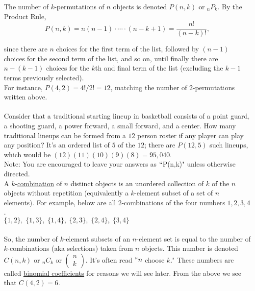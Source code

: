 \documentclass[12pt]{amsart}
\theoremstyle{definition}
\theoremstyle{remark}
\begin{document}
The number of $k$-permutations of $n$ objects is denoted $P(n,k)$ or ${}_n P_k$.  By the Product Rule, $$P(n,k)=n(n-1)\cdot \cdots \cdot(n-k+1)=\frac{n!}{(n-k)!},$$

since there are $n$ choices for the first term of the list, followed by $(n-1)$ choices for the second term of the list, and so on, until finally there are $n-(k-1)$ choices for the $k$th and final term of the list (excluding the $k-1$ terms previously selected).\\

For instance, $P(4,2)=4!/2!=12$, matching the number of $2$-permutations written above.\\ \\

Consider that a traditional starting lineup in basketball consists of a point guard, a shooting guard, a power forward, a small forward, and a center.  How many traditional lineups can be formed from a $12$ person roster if any player can play any position?  It's an ordered list of $5$ of the $12$; there are $P(12,5)$ such lineups, which would be $(12)(11)(10)(9)(8)=95,040$.\\



Note:  You are encouraged to leave your answers as $``$P(n,k)" unless otherwise directed.\\

A $k$-\underline{combination} of $n$ distinct objects is an unordered collection of $k$ of the $n$ objects without repetition (equivalently a $k$-element subset of a set of $n$ elements).  For example, below are all $2$-combinations of the four numbers $1,2,3,4$.\\


$\{1,2\},\;\{1,3\},\;\{1,4\},\;\{2,3\},\;\{2,4\},\;\{3,4\}$\\ \\


So, the number of $k$-element subsets of an $n$-element set is equal to the number of $k$-combinations (aka selections) taken from $n$ objects.  This number is denoted $C(n,k)$ or ${}_n C_k$ or $\displaystyle \left(\begin{array}{c}n\\
k\end{array}\right)$.  It's often read $``n$ choose $k$."  These numbers are called \underline{binomial coefficients} for reasons we will see later.  From the above we see that $C(4,2)=6$.

\newpage
\end{document}
